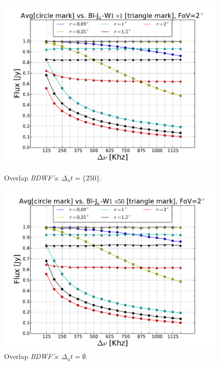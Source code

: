 \documentclass[useAMS,usenatbib]{mn2e}
\begin{document}
\begin{figure}
\begin{minipage}{0.45\linewidth}\includegraphics[width=1\textwidth]{./Figures/max-integ-freq-bessel-w1x1-fov2.pdf}\caption{Overlap 
		\textit{BDWF's}: $\Delta_u t=\{250\}$.}\label{fig:fig_4}\end{minipage}
\begin{minipage}{0.45\linewidth}\includegraphics[width=1\textwidth]{./Figures/max-integ-freq-bessel-w1x50-fov2.pdf}\caption{Overlap 
		\textit{BDWF's}: $\Delta_u t=\emptyset$.}\label{fig:fig_5}\end{minipage}
\end{figure}
\end{document}
